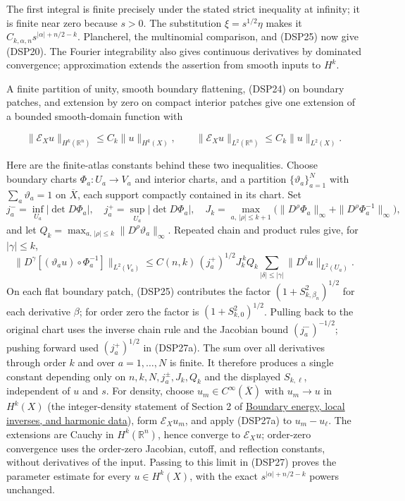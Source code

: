 \documentclass[
  11pt,
]{article}
\begin{document}
The first integral is finite precisely under the stated strict
inequality at infinity; it is finite near zero because \(s>0\). The
substitution \(\xi=s^{1/2}\eta\) makes it
\(C_{k,\alpha,n}s^{|\alpha|+n/2-k}\). Plancherel, the multinomial
comparison, and (DSP25) now give (DSP20). The Fourier integrability also
gives continuous derivatives by dominated convergence; approximation
extends the assertion from smooth inputs to \(H^k\).

A finite partition of unity, smooth boundary flattening, (DSP24) on
boundary patches, and extension by zero on compact interior patches give
one extension of a bounded smooth-domain function with

\[
 \|\mathcal E_Xu\|_{H^k(\mathbb R^n)}\leq C_k\|u\|_{H^k(X)},\qquad
\|\mathcal E_Xu\|_{L^2(\mathbb R^n)}\leq C_k\|u\|_{L^2(X)}.
\]

Here are the finite-atlas constants behind these two inequalities.
Choose boundary charts \(\Phi_a:U_a\to V_a\) and interior charts, and a
partition \(\{\vartheta_a\}_{a=1}^N\) with \(\sum_a\vartheta_a=1\) on
\(\overline X\), each support compactly contained in its chart. Set \[
 j_a^-=\inf_{U_a}|\det D\Phi_a|,\quad
 j_a^+=\sup_{U_a}|\det D\Phi_a|,\quad
 J_k=\max_{a,\,|\rho|\le k+1}
 \bigl(\|D^\rho\Phi_a\|_\infty+\|D^\rho\Phi_a^{-1}\|_\infty\bigr),
\] and let \(Q_k=\max_{a,\,|\rho|\le k}\|D^\rho\vartheta_a\|_\infty\).
Repeated chain and product rules give, for \(|\gamma|\le k\), \[
 \|D^\gamma[(\vartheta_a u)\circ\Phi_a^{-1}]\|_{L^2(V_a)}
 \le C(n,k)\,(j_a^+)^{1/2}J_k^{\,k}Q_k
 \sum_{|\delta|\le|\gamma|}\|D^\delta u\|_{L^2(U_a)}. \tag{DSP27a}
\] On each flat boundary patch, (DSP25) contributes the factor
\((1+S_{k,\beta_n}^2)^{1/2}\) for each derivative \(\beta\); for order
zero the factor is \((1+S_{k,0}^2)^{1/2}\). Pulling back to the original
chart uses the inverse chain rule and the Jacobian bound
\((j_a^-)^{-1/2}\); pushing forward used \((j_a^+)^{1/2}\) in (DSP27a).
The sum over all derivatives through order \(k\) and over
\(a=1,\ldots,N\) is finite. It therefore produces a single constant
depending only on \(n,k,N,j_a^\pm,J_k,Q_k\) and the displayed
\(S_{k,\ell}\), independent of \(u\) and \(s\). For density, choose
\(u_m\in C^\infty(\overline X)\) with \(u_m\to u\) in \(H^k(X)\) (the
integer-density statement of Section 2 of
\href{second-order-boundary.pdf}{Boundary energy, local inverses, and
harmonic data}), form \(\mathcal E_Xu_m\), and apply (DSP27a) to
\(u_m-u_\ell\). The extensions are Cauchy in \(H^k(\mathbb R^n)\), hence
converge to \(\mathcal E_Xu\); order-zero convergence uses the
order-zero Jacobian, cutoff, and reflection constants, without
derivatives of the input. Passing to this limit in (DSP27) proves the
parameter estimate for every \(u\in H^k(X)\), with the exact
\(s^{|\alpha|+n/2-k}\) powers unchanged.
\end{document}
